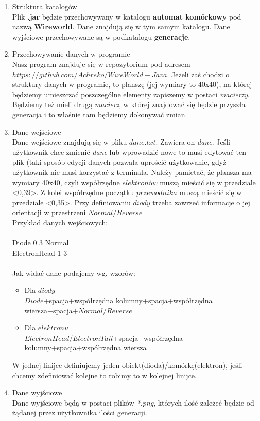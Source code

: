 \documentclass[11pt]{article}
\begin{document}
\begin{enumerate}
\begin{enumerate}[label=\arabic{enumi}.\arabic*.]
 \item Struktura katalogów\\
 Plik \textbf{.jar} będzie przechowywany w katalogu \textbf{automat komórkowy} pod nazwą \textbf{Wireworld}. Dane znajdują się w tym samym katalogu. Dane wyjściowe przechowywane są w podkatalogu \textbf{generacje}.
 \item Przechowywanie danych w programie\\
 Nasz program znajduje się w repozytorium pod adresem $https://github.com/Achreko/WireWorld-Java$. Jeżeli zaś chodzi o struktury danych w programie, to planszę (jej wymiary to 40x40), na której będziemy umieszczać poszczególne elementy zapiszemy w postaci \textit{macierzy}. Będziemy też mieli drugą \textit{macierz}, w której znajdować się będzie przyszła generacja i to właśnie tam będziemy dokonywać zmian.\\
 \item Dane wejściowe\\
 Dane wejściowe znajdują się w pliku $dane.txt$. Zawiera on \textit{dane}.
 Jeśli użytkownik chce zmienić \textit{dane} lub wprowadzić nowe to musi edytować ten plik (taki sposób edycji danych pozwala uprościć użytkowanie, gdyż użytkownik nie musi korzystać z terminala. Należy pamietać, że plansza ma wymiary 40x40, czyli współrzędne $elektronów$ muszą mieścić się w przedziale <0,39>. Z kolei współrzędne początku $przewodnika$ muszą mieścić się w przedziale <0,35>. Przy definiowaniu $diody$ trzeba zawrzeć informacje o jej orientacji w przestrzeni $Normal/Reverse$\\ Przykład danych wejściowych:\\ \\Diode 0 3 Normal\\ ElectronHead 1 3\\  \\  Jak widać dane podajemy wg. wzorów:\\ 
 \begin{itemize}
 \item Dla $diody$\\ $Diode$+spacja+współrzędna kolumny+spacja+współrzędna wiersza+spacja+$Normal/Reverse$\\
  \item Dla $elektronu$\\ $ElectronHead/ElectronTail$+spacja+współrzędna kolumny+spacja+współrzędna wiersza\\
 \end{itemize}
 W jednej linijce definiujemy jeden obiekt(dioda)/komórkę(elektron), jeśli chcemy zdefiniować kolejne to robimy to w kolejnej linijce.\\
 \item Dane wyjściowe\\
 Dane wyjściowe będą w postaci plików \textit{*.png}, których ilość zależeć będzie od żądanej przez użytkownika ilości generacji.
 \end{enumerate}
 


\end{enumerate}
\end{document}
